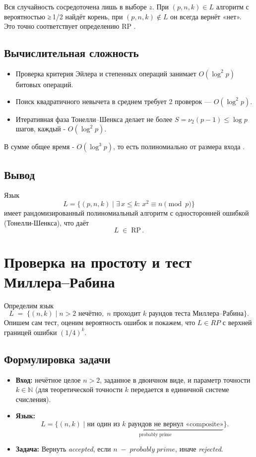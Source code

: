 \documentclass[a4paper,12pt]{article}
\begin{document}
Вся случайность сосредоточена лишь в выборе \(z\). При \((p,n,k)\in L\) алгоритм с вероятностью ≥ 1/2 найдёт корень, при \((p,n,k)\notin L\) он всегда вернёт «нет». Это точно соответствует определению \(\mathrm{RP}\) \cite{Shanks1973}.

\subsection{Вычислительная сложность}

\begin{itemize}
  \item Проверка критерия Эйлера и степенных операций занимает \(O(\log^2 p)\) битовых операций.
  \item Поиск квадратичного невычета в среднем требует 2 проверок — \(O(\log^2 p)\).
  \item Итеративная фаза Тонелли–Шенкса делает не более \(S=\nu_2(p-1)\le\log p\) шагов, каждый - \(O(\log^2 p)\).
\end{itemize}
В сумме общее время - \(O(\log^3 p)\), то есть полиномиально от размера входа \cite{Tonelli1891}.

\subsection{Вывод}

Язык
\[
L = \{(p,n,k)\mid \exists\,x\le k:\,x^2\equiv n\pmod p\}
\]
 имеет рандомизированный полиномиальный алгоритм с односторонней ошибкой (Тонелли-Шенкса), что даёт
\[
L \;\in\;\mathrm{RP}\,.
\]

\newpage
\section{Проверка на простоту и тест Миллера–Рабина}

Определим язык
\[
L \;=\;\bigl\{(n,k)\mid n>2\text{ нечётно},\;n\text{ проходит }k\text{ раундов теста Миллера–Рабина}\bigr\}.
\]
Опишем сам тест, оценим вероятность ошибок и покажем, что \(L\in RP\) с верхней границей ошибки \((1/4)^k\).

\subsection{Формулировка задачи}

\begin{itemize}
  \item \textbf{Вход:} нечётное целое \(n>2\), заданное в двоичном виде, и параметр точности \(k\in\mathbb{N}\) (для теоретической точности \(k\) передается в единичной системе счисления).
  \item \textbf{Язык:}
    \[
      L
      =\bigl\{(n,k)\mid
      \underbrace{\text{ни один из }k\text{ раундов не вернул «composite»}}_{\text{probably prime}}\bigr\}.
    \]
  \item \textbf{Задача:} Вернуть \textit{accepted}, если \(n\;-\;probably\; prime\), иначе \textit{rejected}.
\end{itemize}
\end{document}
